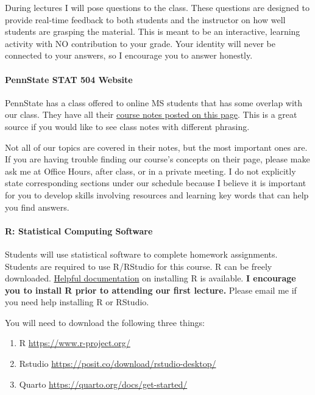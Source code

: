\documentclass[
  letterpaper,
  DIV=11,
  numbers=noendperiod]{scrartcl}
\let\oldparagraph\paragraph
\renewcommand{\paragraph}[1]{\oldparagraph{#1}\mbox{}}
\begin{document}
During lectures I will pose questions to the class. These questions are
designed to provide real-time feedback to both students and the
instructor on how well students are grasping the material. This is meant
to be an interactive, learning activity with NO contribution to your
grade. Your identity will never be connected to your answers, so I
encourage you to answer honestly.

\hypertarget{pennstate-stat-504-website}{%
\paragraph{PennState STAT 504
Website}\label{pennstate-stat-504-website}}

PennState has a class offered to online MS students that has some
overlap with our class. They have all their
\href{https://online.stat.psu.edu/stat504/lesson/welcome-stat-504}{course
notes posted on this page}. This is a great source if you would like to
see class notes with different phrasing.

Not all of our topics are covered in their notes, but the most important
ones are. If you are having trouble finding our course's concepts on
their page, please make ask me at Office Hours, after class, or in a
private meeting. I do not explicitly state corresponding sections under
our schedule because I believe it is important for you to develop skills
involving resources and learning key words that can help you find
answers.~

\hypertarget{r-statistical-computing-software}{%
\paragraph{R: Statistical Computing
Software}\label{r-statistical-computing-software}}

Students will use statistical software to complete homework assignments.
Students are required to use R/RStudio for this course. R can be freely
downloaded.
\href{https://rstudio-education.github.io/hopr/starting.html}{Helpful
documentation} on installing R is available. \textbf{I encourage you to
install R prior to attending our first lecture.} Please email me if you
need help installing R or RStudio.

You will need to download the following three things:

\begin{enumerate}
\def\labelenumi{\arabic{enumi}.}
\item
  R \url{https://www.r-project.org/}
\item
  Rstudio \url{https://posit.co/download/rstudio-desktop/}
\item
  Quarto \url{https://quarto.org/docs/get-started/}
\end{enumerate}
\end{document}
